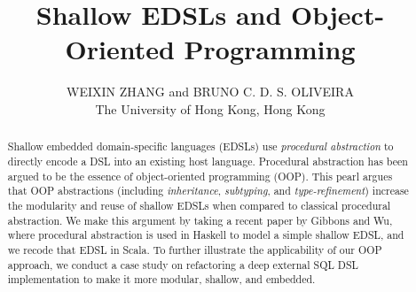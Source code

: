 \documentclass{jfp1}
\begin{document}
\title{Shallow EDSLs and Object-Oriented Programming}

\author[W. Zhang and B. Oliveira]
        {WEIXIN ZHANG and BRUNO C. D. S. OLIVEIRA\\
         The University of Hong Kong, Hong Kong}

\maketitle[f]

\begin{abstract}
Shallow embedded domain-specific languages (EDSLs) use
\emph{procedural abstraction} to directly encode a DSL into an existing host language. Procedural abstraction has
been argued to be the essence of object-oriented programming (OOP).
This pearl argues that OOP abstractions
(including \emph{inheritance}, \emph{subtyping}, and
\emph{type-refinement})
increase the modularity and reuse of shallow
EDSLs when compared to classical procedural abstraction. We make this
argument by taking a recent paper by Gibbons and Wu, where procedural
abstraction is used in Haskell to model a simple shallow EDSL, and we recode
that EDSL in Scala. 
To further illustrate the applicability of our OOP approach, we conduct
a case study on refactoring a deep external SQL DSL implementation to make it
more modular, shallow, and embedded.
\end{abstract}















\end{document}
